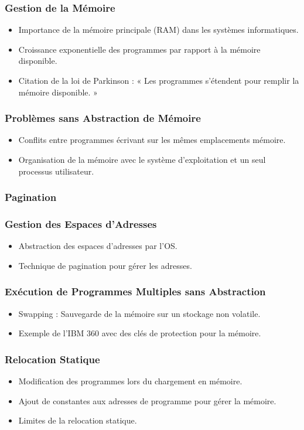 \documentclass{beamer}
\begin{document}
\begin{frame}
\frametitle{Gestion de la Mémoire}
\begin{itemize}
    \item Importance de la mémoire principale (RAM) dans les systèmes informatiques.
    \item Croissance exponentielle des programmes par rapport à la mémoire disponible.
    \item Citation de la loi de Parkinson : « Les programmes s'étendent pour remplir la mémoire disponible. »
\end{itemize}
\end{frame}

\begin{frame}
\frametitle{Problèmes sans Abstraction de Mémoire}
\begin{itemize}
    \item Conflits entre programmes écrivant sur les mêmes emplacements mémoire.
    \item Organisation de la mémoire avec le système d'exploitation et un seul processus utilisateur.
\end{itemize}
\end{frame}

\begin{frame}
\frametitle{Pagination}
\end{frame}

\begin{frame}
\frametitle{Gestion des Espaces d'Adresses}
\begin{itemize}
    \item Abstraction des espaces d'adresses par l'OS.
    \item Technique de pagination pour gérer les adresses.
\end{itemize}

\end{frame}
\begin{frame}
\frametitle{Exécution de Programmes Multiples sans Abstraction}
\begin{itemize}
    \item Swapping : Sauvegarde de la mémoire sur un stockage non volatile.
    \item Exemple de l'IBM 360 avec des clés de protection pour la mémoire.
\end{itemize}
\end{frame}

\begin{frame}
\frametitle{Relocation Statique}
\begin{itemize}
    \item Modification des programmes lors du chargement en mémoire.
    \item Ajout de constantes aux adresses de programme pour gérer la mémoire.
    \item Limites de la relocation statique.
\end{itemize}
\end{frame}
\end{document}
